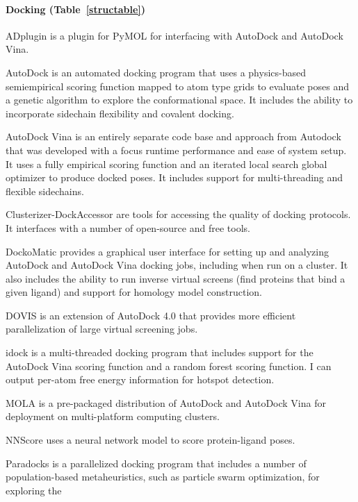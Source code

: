 \paragraph{Docking (Table~\ref{structable})}

ADplugin is a plugin for PyMOL for interfacing with AutoDock and AutoDock Vina.

AutoDock \cite{Morris_2009} is an automated docking program that uses a physics-based semiempirical scoring function \cite{Huey_2007} mapped to atom type grids to evaluate poses and a genetic algorithm to explore the conformational space.  It includes the ability to incorporate sidechain flexibility and covalent docking.

AutoDock Vina \cite{Trott_2009} is an entirely separate code base and approach from Autodock that was developed with a focus runtime performance and ease of system setup. It uses a fully empirical scoring function and an iterated local search global optimizer to produce docked poses. It includes support for multi-threading and flexible sidechains.

Clusterizer-DockAccessor \cite{Ballante_2016} are tools for accessing the quality of docking protocols. It interfaces with a number of open-source and free tools.

DockoMatic \cite{Bullock_2013}  provides a graphical user interface for setting up and analyzing AutoDock and AutoDock Vina docking jobs, including when run on a cluster. It also includes the ability to run inverse virtual screens (find proteins that bind a given ligand) and support for homology model construction.

DOVIS \cite{Jiang_2008} is an extension of AutoDock 4.0 that provides more efficient parallelization of large virtual screening jobs.

idock \cite{Li_2012} is a multi-threaded docking program that includes support for the AutoDock Vina scoring function and a random forest scoring function. I can output per-atom free energy information for hotspot detection.

MOLA \cite{Abreu_2010} is a pre-packaged distribution of AutoDock and AutoDock Vina for deployment on multi-platform computing clusters.

NNScore \cite{Durrant_2011} uses a neural network model to score protein-ligand poses.

Paradocks \cite{Meier_2010} is a parallelized docking program that includes a number of population-based metaheuristics, such as particle swarm optimization, for exploring the 

